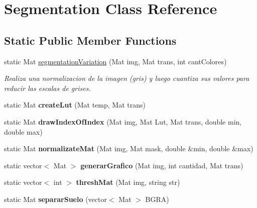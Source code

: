 \hypertarget{classSegmentation}{}\section{Segmentation Class Reference}
\label{classSegmentation}
\subsection*{Static Public Member Functions}
\begin{DoxyCompactItemize}
\item 
static Mat \mbox{\hyperlink{classSegmentation_a68ad8bc7035c2e0b5f09f8d264b418bc}{segmentation\+Variation}} (Mat img, Mat trans, int cant\+Colores)
\begin{DoxyCompactList}\small\item\em Realiza una normalizacion de la imagen (gris) y luego cuantiza sus valores para reducir las escalas de grises. \end{DoxyCompactList}\item 
\mbox{\label{classSegmentation_aa15a21553b49e70fc2ee5a3be3ff9695}} 
static Mat {\bfseries create\+Lut} (Mat temp, Mat trans)
\item 
\mbox{\label{classSegmentation_a0894154b8202a84decfdd991dda750c1}} 
static Mat {\bfseries draw\+Index\+Of\+Index} (Mat img, Mat Lut, Mat trans, double min, double max)
\item 
\mbox{\label{classSegmentation_a4f43910a97bc9b895ef3796e5ab6eb5a}} 
static Mat {\bfseries normalizate\+Mat} (Mat img, Mat mask, double \&min, double \&max)
\item 
\mbox{\label{classSegmentation_a83c50607e87525469ce7876894e5f5ab}} 
static vector$<$ Mat $>$ {\bfseries generar\+Grafico} (Mat img, int cantidad, Mat trans)
\item 
\mbox{\label{classSegmentation_a40ecb2a81891f58d72e653f9450c6b8f}} 
static vector$<$ int $>$ {\bfseries thresh\+Mat} (Mat img, string str)
\item 
\mbox{\label{classSegmentation_abe304fc9d6a13f16927ae7682f90b540}} 
static Mat {\bfseries separar\+Suelo} (vector$<$ Mat $>$ B\+G\+RA)
\end{DoxyCompactItemize}
